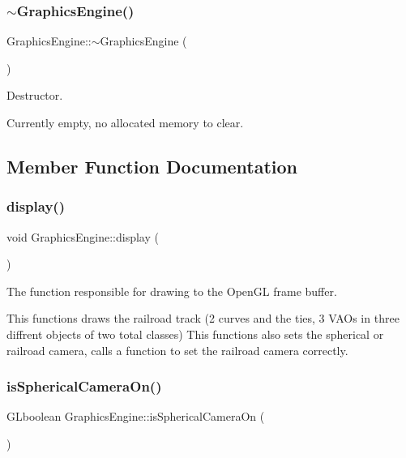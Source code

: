 \subsubsection{\texorpdfstring{$\sim$\+Graphics\+Engine()}{~GraphicsEngine()}}
{\footnotesize\ttfamily Graphics\+Engine\+::$\sim$\+Graphics\+Engine (\begin{DoxyParamCaption}{ }\end{DoxyParamCaption})}



Destructor. 

Currently empty, no allocated memory to clear. 

\subsection{Member Function Documentation}
\mbox{\label{class_graphics_engine_a2f0bdf1a47bf9e8d4f1c9525c2ebc8f9}} 
\subsubsection{\texorpdfstring{display()}{display()}}
{\footnotesize\ttfamily void Graphics\+Engine\+::display (\begin{DoxyParamCaption}{ }\end{DoxyParamCaption})}



The function responsible for drawing to the Open\+GL frame buffer. 

This functions draws the railroad track (2 curves and the ties, 3 V\+AO\textquotesingle{}s in three diffrent objects of two total classes) This functions also sets the spherical or railroad camera, calls a function to set the railroad camera correctly. \mbox{\label{class_graphics_engine_a45375adf56d4769b0f33206dc760a1f6}} 
\subsubsection{\texorpdfstring{is\+Spherical\+Camera\+On()}{isSphericalCameraOn()}}
{\footnotesize\ttfamily G\+Lboolean Graphics\+Engine\+::is\+Spherical\+Camera\+On (\begin{DoxyParamCaption}{ }\end{DoxyParamCaption})}



